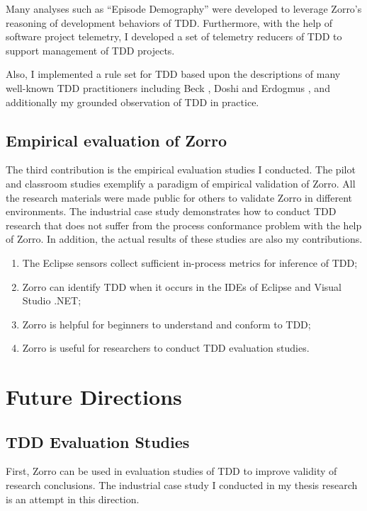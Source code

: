 Many analyses such as ``Episode Demography'' were developed to leverage Zorro's reasoning of development behaviors of TDD. Furthermore, with the help of software project telemetry, I developed a set of telemetry reducers of TDD to support management of TDD projects. 

Also, I implemented a rule set for TDD based upon the descriptions of many well-known TDD practitioners including Beck \cite{Beck:03}, Doshi \cite{TDDQuickReference} and Erdogmus \cite{Wang:04}, and additionally my grounded observation of TDD in practice. 

\subsection{Empirical evaluation of Zorro}

The third contribution is the empirical evaluation studies I conducted. The pilot and classroom studies exemplify a paradigm of empirical validation of Zorro. All the research materials were made public for others to validate Zorro in different environments. The industrial case study demonstrates how to conduct TDD research that does not suffer from the process conformance problem with the help of Zorro. In addition, the actual results of these studies are also my contributions. 
\begin{enumerate}
\item The Eclipse sensors collect sufficient in-process metrics for inference of TDD;
\item Zorro can identify TDD when it occurs in the IDEs of Eclipse and Visual Studio .NET; 
\item Zorro is helpful for beginners to understand and conform to TDD;
\item Zorro is useful for researchers to conduct TDD evaluation studies.
\end{enumerate}

\section{Future Directions}
\label{sec:FutureDirections}

\subsection{TDD Evaluation Studies}
First, Zorro can be used in evaluation studies of TDD to improve validity of research conclusions. The industrial case study I conducted in my thesis research is an attempt in this direction.

